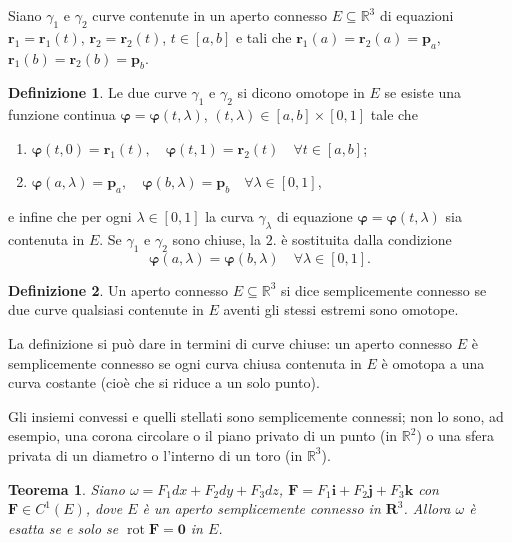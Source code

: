 \documentclass[a4paper]{book}
\DeclareMathOperator{\rot}{rot}
\numberwithin{equation}{section}
\renewcommand{\phi}{\varphi}
\theoremstyle{plain}
\newtheorem{teor}{Teorema}[section]
\theoremstyle{definition}
\newtheorem{defn}{Definizione}[section]
\theoremstyle{remark}
\renewcommand{\vec}{\boldsymbol}
\theoremstyle{example}
\begin{document}
Siano $\gamma_1$ e $\gamma_2$ curve contenute in un aperto connesso $E \subseteq \mathbb{R}^3$ di equazioni $\vec{r}_1 = \vec{r}_1(t)$, $\vec{r}_2 = \vec{r}_2(t)$, $t \in [a, b]$ e tali che $\vec{r}_1(a) = \vec{r}_2(a)=\vec{p}_a$, $\vec{r}_1(b) = \vec{r}_2(b) = \vec{p}_b$.

	\begin{defn}
	Le due curve $\gamma_1$ e $\gamma_2$ si dicono omotope in $E$ se esiste una funzione continua $\vec{\phi} = \vec{\phi}(t, \lambda)$, $(t, \lambda) \in [a, b] \times [0, 1]$ tale che
	\begin{enumerate}
	\item $\vec{\phi}(t, 0) = \vec{r}_1(t), \quad \vec{\phi}(t, 1) = \vec{r}_2(t) \quad \forall t \in [a, b]$;
	\item $\vec{\phi}(a, \lambda) = \vec{p}_a, \quad \vec{\phi}(b, \lambda) = \vec{p}_b \quad \forall \lambda \in [0, 1] $,
	\end{enumerate}
e infine che per ogni $\lambda \in [0, 1]$ la curva $\gamma_{\lambda}$ di equazione $\vec{\phi} = \vec{\phi}(t, \lambda)$ sia contenuta in $E$. Se $\gamma_1$ e $\gamma_2$ sono chiuse, la $2.$ è sostituita dalla condizione
	\begin{equation*}
	\vec{\phi}(a, \lambda) = \vec{\phi}(b, \lambda) \quad \forall \lambda \in [0, 1].
	\end{equation*}
	\end{defn}

\begin{defn}
Un aperto connesso $E \subseteq \mathbb{R}^3$ si dice semplicemente connesso se due curve qualsiasi contenute in $E$ aventi gli stessi estremi sono omotope.
\end{defn}

La definizione si può dare in termini di curve chiuse: un aperto connesso $E$ è semplicemente connesso se ogni curva chiusa contenuta in $E$ è omotopa a una curva costante (cioè che si riduce a un solo punto).

Gli insiemi convessi e quelli stellati sono semplicemente connessi; non lo sono, ad esempio, una corona circolare o il piano privato di un punto (in $\mathbb{R}^2$) o una sfera privata di un diametro o l'interno di un toro (in $\mathbb{R}^3$).

\begin{teor}
Siano $\omega = F_1dx + F_2 dy + F_3 dz$, $\vec{F} = F_1\vec{i} + F_2\vec{j} + F_3\vec{k}$ con $\vec{F} \in C^1(E)$, dove $E$ è un aperto semplicemente connesso in $\vec{R}^3$. Allora $\omega$ è esatta se e solo se $\rot{\vec{F}} = \vec{0}$ in $E$.
\end{teor}
\end{document}
